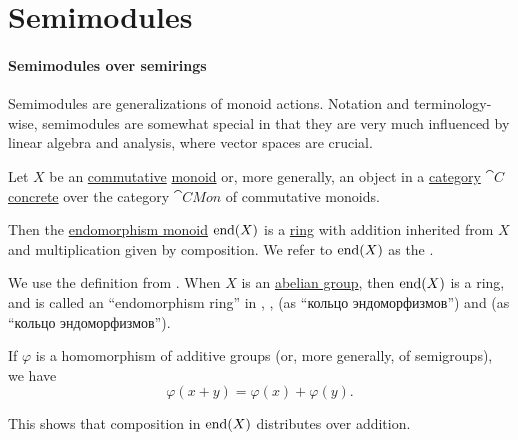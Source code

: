 \section{Semimodules}\label{sec:semimodules}

\paragraph{Semimodules over semirings}

Semimodules are generalizations of monoid actions. Notation and terminology-wise, semimodules are somewhat special in that they are very much influenced by linear algebra and analysis, where vector spaces are crucial.

\begin{definition}\label{def:endomorphism_semiring}\mimprovised
  Let \( X \) be an \hyperref[def:binary_operation/commutative]{commutative} \hyperref[def:monoid]{monoid} or, more generally, an object in a \hyperref[def:category]{category} \( \cat{C} \) \hyperref[def:concrete_category]{concrete} over the category \( \cat{CMon} \) of commutative monoids.

  Then the \hyperref[def:endomorphism_monoid]{endomorphism monoid} \( \operatorname{end}(X) \) is a \hyperref[def:ring]{ring} with addition inherited from \( X \) and multiplication given by composition. We refer to \( \operatorname{end}(X) \) as the .
\end{definition}
\begin{comments}
  \item We use the definition from \cite[example 1.14]{Golan1999Semirings}. When \( X \) is an \hyperref[def:abelian_group]{abelian group}, then \( \operatorname{end}(X) \) is a ring, and is called an \enquote{endomorphism ring} in
  \cite{Jacobson1985BasicAlgebraI},
  \cite[\S 2.5]{Aluffi2009Algebra},
  \cite[130]{Курош1973ОбщаяАлгебра} (as \enquote{кольцо эндоморфизмов}) and
  \cite[107]{Шафаревич1999ОсновныеПонятияАлгебры} (as \enquote{кольцо эндоморфизмов}).
\end{comments}
\begin{defproof}
  If \( \varphi \) is a homomorphism of additive groups (or, more generally, of semigroups), we have
  \begin{equation*}
    \varphi(x + y) = \varphi(x) + \varphi(y).
  \end{equation*}

  This shows that composition in \( \operatorname{end}(X) \) distributes over addition.
\end{defproof}

